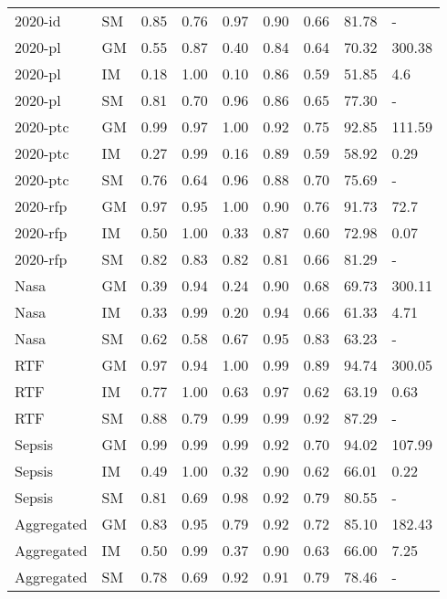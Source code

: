 \begin{tabular}{llrrrrrrl}
2020-id & SM & 0.85 & 0.76 & 0.97 & 0.90 & 0.66 & 81.78 & - \\
2020-pl & GM & 0.55 & 0.87 & 0.40 & 0.84 & 0.64 & 70.32 & 300.38 \\
2020-pl & IM & 0.18 & 1.00 & 0.10 & 0.86 & 0.59 & 51.85 & 4.6 \\
2020-pl & SM & 0.81 & 0.70 & 0.96 & 0.86 & 0.65 & 77.30 & - \\
2020-ptc & GM & 0.99 & 0.97 & 1.00 & 0.92 & 0.75 & 92.85 & 111.59 \\
2020-ptc & IM & 0.27 & 0.99 & 0.16 & 0.89 & 0.59 & 58.92 & 0.29 \\
2020-ptc & SM & 0.76 & 0.64 & 0.96 & 0.88 & 0.70 & 75.69 & - \\
2020-rfp & GM & 0.97 & 0.95 & 1.00 & 0.90 & 0.76 & 91.73 & 72.7 \\
2020-rfp & IM & 0.50 & 1.00 & 0.33 & 0.87 & 0.60 & 72.98 & 0.07 \\
2020-rfp & SM & 0.82 & 0.83 & 0.82 & 0.81 & 0.66 & 81.29 & - \\
Nasa & GM & 0.39 & 0.94 & 0.24 & 0.90 & 0.68 & 69.73 & 300.11 \\
Nasa & IM & 0.33 & 0.99 & 0.20 & 0.94 & 0.66 & 61.33 & 4.71 \\
Nasa & SM & 0.62 & 0.58 & 0.67 & 0.95 & 0.83 & 63.23 & - \\
RTF & GM & 0.97 & 0.94 & 1.00 & 0.99 & 0.89 & 94.74 & 300.05 \\
RTF & IM & 0.77 & 1.00 & 0.63 & 0.97 & 0.62 & 63.19 & 0.63 \\
RTF & SM & 0.88 & 0.79 & 0.99 & 0.99 & 0.92 & 87.29 & - \\
Sepsis & GM & 0.99 & 0.99 & 0.99 & 0.92 & 0.70 & 94.02 & 107.99 \\
Sepsis & IM & 0.49 & 1.00 & 0.32 & 0.90 & 0.62 & 66.01 & 0.22 \\
Sepsis & SM & 0.81 & 0.69 & 0.98 & 0.92 & 0.79 & 80.55 & - \\
Aggregated & GM & 0.83 & 0.95 & 0.79 & 0.92 & 0.72 & 85.10 & 182.43 \\
Aggregated & IM & 0.50 & 0.99 & 0.37 & 0.90 & 0.63 & 66.00 & 7.25 \\
Aggregated & SM & 0.78 & 0.69 & 0.92 & 0.91 & 0.79 & 78.46 & - \\
\bottomrule
\end{tabular}
